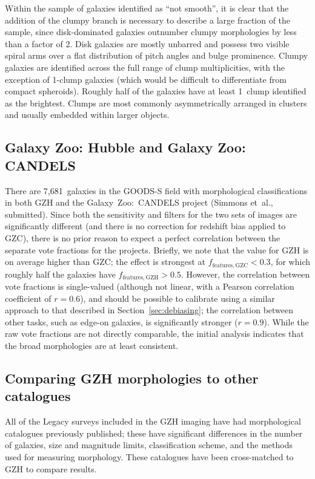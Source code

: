 \documentclass[a4paper,fleqn,usenatbib]{mnras}
\begin{document}
Within the sample of galaxies identified as ``not smooth'', it is clear that
the addition of the clumpy branch is necessary to describe a large fraction of
the sample, since disk-dominated galaxies outnumber clumpy morphologies by less than
a factor of 2. Disk galaxies are mostly unbarred \citep{mel14} and
possess two visible spiral arms over a flat distribution of pitch angles and
bulge prominence. Clumpy galaxies are identified across the full range of clump
multiplicities, with the exception of 1-clump galaxies (which would be
difficult to differentiate from compact spheroids). Roughly half of the
galaxies have at least 1~clump identified as the brightest. Clumps are most
commonly asymmetrically arranged in clusters and usually embedded within
larger objects. 

\subsection{Galaxy Zoo: Hubble and Galaxy Zoo: CANDELS}\label{ssec:gzh_gzc}

There are 7,681~galaxies in the GOODS-S field with morphological
classifications in both GZH and the Galaxy~Zoo:~CANDELS project (Simmons
et~al., submitted). Since both the sensitivity and filters for the two sets of
images are significantly different (and there is no correction for redshift
bias applied to GZC), there is no prior reason to expect a perfect correlation
between the separate vote fractions for the projects. Briefly, we note that the
\ffeatures{} value for GZH is on average higher than GZC; the effect is
strongest at $f_\mathrm{features,GZC}<0.3$, for which roughly half the galaxies
have $f_\mathrm{features,GZH}>0.5$. However, the correlation between vote
fractions is single-valued (although not linear, with a Pearson correlation
coefficient of $r=0.6$), and should be possible to calibrate using a similar
approach to that described in Section~\ref{sec:debiasing}; the correlation
between other tasks, such as edge-on galaxies, is significantly stronger
($r=0.9$). While the raw vote fractions are not directly comparable, the
initial analysis indicates that the broad morphologies are at least consistent.

\subsection{Comparing GZH morphologies to other catalogues}\label{ssec:comparisons}

All of the Legacy surveys included in the GZH imaging have had morphological
catalogues previously published; these have significant differences in
the number of galaxies, size and magnitude limits, classification scheme, and
the methods used for measuring morphology. These catalogues have been
cross-matched to GZH to compare results. 
\end{document}
